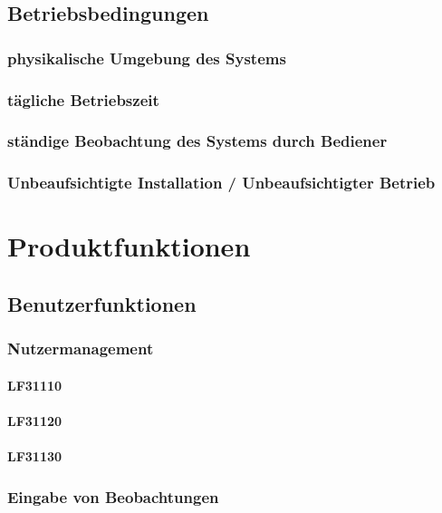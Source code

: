 \documentclass[a4paper,11pt]{article}             %
\begin{document}
	\subsection{Betriebsbedingungen}
		\subsubsection{physikalische Umgebung des Systems}
		\subsubsection{tägliche Betriebszeit}
		\subsubsection{ständige Beobachtung des Systems durch Bediener}
		\subsubsection{Unbeaufsichtigte Installation / Unbeaufsichtigter Betrieb}




\section{Produktfunktionen}
	\subsection{Benutzerfunktionen}
		\subsubsection{Nutzermanagement}
			\paragraph{LF31110}
			\paragraph{LF31120}
			\paragraph{LF31130}
			
		\subsubsection{Eingabe von Beobachtungen}
\end{document}

